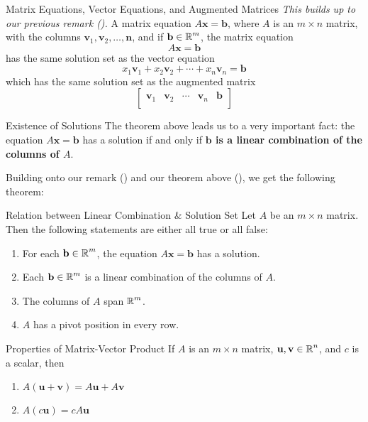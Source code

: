 \documentclass{article}
\begin{document}
\begin{theorem}{Matrix Equations, Vector Equations, and Augmented Matrices}
	\emph{This builds up to our previous remark ().}
	A matrix equation $A\mathbf{x} = \mathbf{b}$, where $A$ is an $m \times n$ matrix, with the columns $\mathbf{v}_1, \mathbf{v}_2, \ldots, \mathbf{n}$, and if $\mathbf{b} \in \operatorname{\mathbb{R}}^m$, the matrix equation
	$$
		A\mathbf{x} = \mathbf{b}
	$$
	has the same solution set as the vector equation
	$$
		x_1\mathbf{v}_1 + x_2\mathbf{v}_2 + \cdots + x_n\mathbf{v}_n = \mathbf{b}
	$$
	which has the same solution set as the augmented matrix
	$$
		\begin{bmatrix}
			\mathbf{v}_1 & \mathbf{v}_2 & \cdots & \mathbf{v}_n & \mathbf{b} \\
		\end{bmatrix}
	$$
\end{theorem}

\begin{info}{Existence of Solutions}
	The theorem above leads us to a very important fact: the equation $A\mathbf{x} = \mathbf{b}$ has a solution if and only if \textbf{$\mathbf{b}$ is a linear combination of the columns of $A$}.
\end{info}

Building onto our remark () and our theorem above (), we get the following theorem:

\begin{theorem}{Relation between Linear Combination \& Solution Set}
	Let $A$ be an $m \times n$ matrix. Then the following statements are either all true or all false:
	\begin{enumerate}[label=\alph*),topsep=0pt]
		\item
		      For each $\mathbf{b} \in \operatorname{\mathbb{R}}^m$, the equation $A\mathbf{x} = \mathbf{b}$ has a solution.
		\item
		      Each $\mathbf{b} \in \operatorname{\mathbb{R}}^m$ is a linear combination of the columns of $A$.
		\item
		      The columns of $A$ span $\operatorname{\mathbb{R}}^m$.
		\item
		      $A$ has a pivot position in every row.
	\end{enumerate}
\end{theorem}

\begin{theorem}{Properties of Matrix-Vector Product}
	If $A$ is an $m \times n$ matrix, $\mathbf{u}, \mathbf{v} \in \operatorname{\mathbb{R}}^n$, and $c$ is a scalar, then
	\begin{enumerate}[label=\alph*),topsep=0pt]
		\item
		      $A(\mathbf{u} + \mathbf{v}) = A\mathbf{u} + A\mathbf{v}$
		\item
		      $A(c\mathbf{u}) = cA\mathbf{u}$
	\end{enumerate}
\end{theorem}
\end{document}
